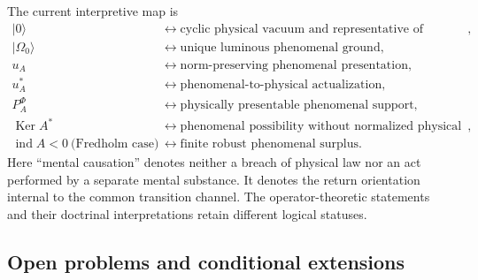 \documentclass[11pt,reqno]{scrartcl}
\newcommand{\ket}[1]{\lvert #1\rangle}
\DeclareMathOperator{\Ker}{Ker}
\DeclareMathOperator{\ind}{ind}
\newcommand{\suppProjF}{P_{A}^{\Phi}}
\theoremstyle{plain}
\theoremstyle{definition}
\theoremstyle{remark}
\begin{document}
The current interpretive map is
\begin{equation}
  \boxed{
  \begin{aligned}
  \ket0
  &\longleftrightarrow
  \text{cyclic physical vacuum and representative of emptiness},\\
  \ket{\Omega_0}
  &\longleftrightarrow
  \text{unique luminous phenomenal ground},\\
  u_A
  &\longleftrightarrow
  \text{norm-preserving phenomenal presentation},\\
  u_A^*
  &\longleftrightarrow
  \text{phenomenal-to-physical actualization},\\
  \suppProjF
  &\longleftrightarrow
  \text{physically presentable phenomenal support},\\
  \Ker A^*
  &\longleftrightarrow
  \text{phenomenal possibility without normalized physical partner},\\
  \ind A<0\ \text{(Fredholm case)}
  &\longleftrightarrow
  \text{finite robust phenomenal surplus}.
  \end{aligned}}
  \label{eq:current-doctrinal-map}
\end{equation}
Here ``mental causation'' denotes neither a breach of physical law nor an act
performed by a separate mental substance.  It denotes the return orientation
internal to the common transition channel.  The operator-theoretic statements
and their doctrinal interpretations retain different logical statuses.

\subsection{Open problems and conditional extensions}
\end{document}
